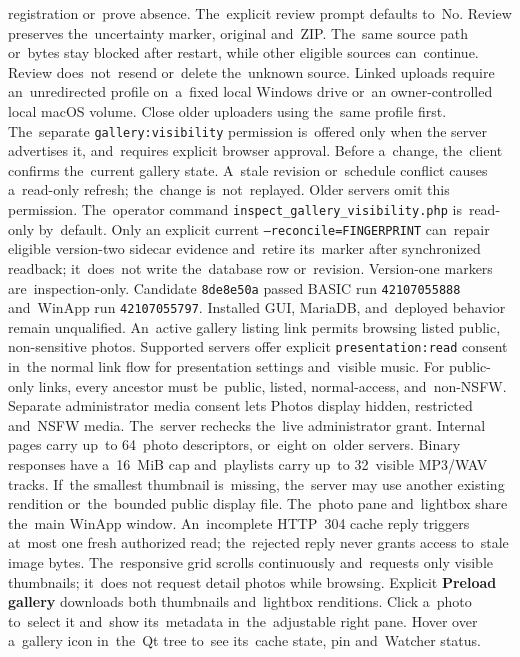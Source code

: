 \documentclass[11pt,a4paper]{article}
\newcommand{\ui}[1]{\textbf{#1}}
\begin{document}
registration or~prove absence. The~explicit review prompt defaults to~No.
Review preserves the~uncertainty marker, original and~ZIP. The~same source path
or~bytes stay blocked after restart, while other eligible sources can~continue.
Review does~not~resend or~delete the~unknown source.
Linked uploads require an~unredirected profile on~a~fixed local Windows
drive or~an owner-controlled local macOS volume. Close older uploaders
using the~same profile first.
The~separate \texttt{gallery:visibility} permission is~offered only when the
server advertises it, and~requires explicit browser approval. Before a~change,
the~client confirms the~current gallery state. A~stale revision or~schedule
conflict causes a~read-only refresh; the~change is~not~replayed. Older servers
omit this permission. The~operator command
\texttt{inspect\_gallery\_visibility.php} is~read-only by~default. Only an
explicit current \texttt{--reconcile=FINGERPRINT} can~repair eligible version-two
sidecar evidence and~retire its~marker after synchronized readback; it~does~not
write the~database row or~revision. Version-one markers are~inspection-only.
Candidate \texttt{8de8e50a} passed BASIC run \texttt{42107055888} and~WinApp
run \texttt{42107055797}. Installed GUI, MariaDB, and~deployed behavior
remain unqualified.
An~active gallery listing link permits browsing listed public, non-sensitive
photos. Supported servers offer explicit \texttt{presentation:read} consent
in~the normal link flow for presentation settings and~visible music.
For public-only links, every ancestor must be~public, listed, normal-access,
and~non-NSFW. Separate administrator media consent lets Photos display hidden,
restricted and~NSFW media. The~server rechecks the~live administrator grant.
Internal pages carry up~to 64~photo descriptors, or~eight on~older servers.
Binary responses have a~16~MiB cap and~playlists carry up~to 32~visible
MP3/WAV tracks. If~the
smallest thumbnail is~missing, the~server may use another existing rendition
or~the~bounded public display file. The~photo pane and~lightbox share the~main
WinApp window.
An~incomplete HTTP~304 cache reply triggers at~most one fresh authorized read;
the~rejected reply never grants access to~stale image bytes.
The~responsive grid scrolls continuously and~requests only visible thumbnails;
it~does not request detail photos while browsing. Explicit \ui{Preload gallery}
downloads both thumbnails and~lightbox renditions. Click a~photo to~select it
and~show its~metadata in~the~adjustable right pane. Hover over a~gallery icon
in~the~Qt tree to~see its~cache state, pin and~Watcher status.
\end{document}

